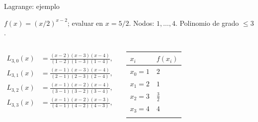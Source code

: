 \documentclass[main.tex]{subfiles}
\begin{document}
\begin{frame}[t]{Lagrange: ejemplo}
\par\noindent\begin{minipage}[t][7.5mm][t]{\textwidth}\small\strut $f(x)=(x/2)^{x-2}$; evaluar en $x=5/2$. Nodos: $1,\ldots,4$. Polinomio de grado $\le 3$.\end{minipage}\par\nointerlineskip
\begin{columns}[T]\small\setlength{\abovedisplayskip}{4pt}\setlength{\belowdisplayskip}{4pt}\scriptsize\begin{align*}L_{3,0}(x)&=\frac{(x-2)(x-3)(x-4)}{(1-2)(1-3)(1-4)},\\L_{3,1}(x)&=\frac{(x-1)(x-3)(x-4)}{(2-1)(2-3)(2-4)},\\L_{3,2}(x)&=\frac{(x-1)(x-2)(x-4)}{(3-1)(3-2)(3-4)},\\L_{3,3}(x)&=\frac{(x-1)(x-2)(x-3)}{(4-1)(4-2)(4-3)},\\\end{align*}\begingroup\small\setlength{\tabcolsep}{3pt}\begin{center}\begin{tabular}{|C{.42\textwidth}|C{.42\textwidth}|}\hline
\rule[-2mm]{0pt}{6mm}$x_i$&$f(x_i)$\\\hline
\rule[-2.5mm]{0pt}{6mm}$x_0=1$&$2$\\\hline
\rule[-2.5mm]{0pt}{6mm}$x_1=2$&$1$\\\hline
\rule[-2.5mm]{0pt}{6mm}$x_2=3$&$\frac{3}{2}$\\\hline
\rule[-2.5mm]{0pt}{6mm}$x_3=4$&$4$\\\hline
\rule[-2.5mm]{0pt}{6mm}&\\\hline
\end{tabular}\end{center}\endgroup\par
\end{columns}
\end{frame}
\end{document}
